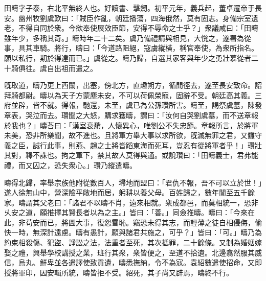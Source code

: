 \begin{pinyinscope}
 
 
 田疇字子泰，右北平無終人也。好讀書、擊劒。初平元年，義兵起，董卓遷帝于長安。幽州牧劉虞歎曰：「賊臣作亂，朝廷播蕩，四海俄然，莫有固志。身備宗室遺老，不得自同於衆。今欲奉使展效臣節，安得不辱命之士乎？」衆議咸曰：「田疇雖年少，多稱其奇。」疇時年二十二矣。虞乃備禮請與相見，大恱之，遂署為從事，具其車騎。將行，疇曰：「今道路阻絕，寇虜縱橫，稱官奉使，為衆所指名。願以私行，期於得達而已。」虞從之。疇乃歸，自選其家客與年少之勇壯慕從者二十騎俱往。虞自出祖而遣之。
 
 
 旣取道，疇乃更上西關，出塞，傍北方，直趣朔方，循閒徑去，遂至長安致命。詔拜騎都尉。疇以為天子方蒙塵未安，不可以荷佩榮寵，固辭不受。朝廷高其義。三府並辟，皆不就。得報，馳還，未至，虞已為公孫瓚所害。疇至，謁祭虞墓，陳發章表，哭泣而去。瓚聞之大怒，購求獲疇，謂曰：「汝何自哭劉虞墓，而不送章報於我也？」疇荅曰：「漢室衰穨，人懷異心，唯劉公不失忠節。章報所言，於將軍未美，恐非所樂聞，故不進也。且將軍方舉大事以求所欲，旣滅無罪之君，又讎守義之臣，誠行此事，則燕、趙之士將皆蹈東海而死耳，豈忍有從將軍者乎！」瓚壯其對，釋不誅也。拘之軍下，禁其故人莫得與通。或說瓚曰：「田疇義士，君弗能禮，而又囚之，恐失衆心。」瓚乃縱遣疇。
 
 
 
 
 疇得北歸，率舉宗族他附從數百人，埽地而盟曰：「君仇不報，吾不可以立於世！」遂人徐無山中，營深險平敞地而居，躬耕以養父母。百姓歸之，數年閒至五千餘家。疇謂其父老曰：「諸君不以疇不肖，遠來相就。衆成都邑，而莫相統一，恐非乆安之道，願推擇其賢長者以為之主。」皆曰：「善。」同僉推疇。疇曰：「今來在此，非苟安而已，將圖大事，復怨雪恥。竊恐未得其志，而輕薄之徒自相侵侮，偷快一時，無深計遠慮。疇有愚計，願與諸君共施之，可乎？」皆曰：「可。」疇乃為約束相殺傷、犯盜、諍訟之法，法重者至死，其次抵罪，二十餘條。又制為婚姻嫁娶之禮，興舉學校講授之業，班行其衆，衆皆便之，至道不拾遺。北邊翕然服其威信，烏丸、鮮卑並各遣譯使致貢遺，疇悉撫納，令不為寇。袁紹數遣使招命，又即授將軍印，因安輯所統，疇皆拒不受。紹死，其子尚又辟焉，疇終不行。
 

\end{pinyinscope}
